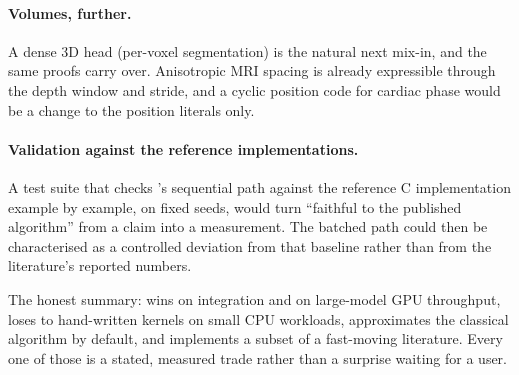 \paragraph{Volumes, further.}
A dense 3D head (per-voxel segmentation) is the natural next mix-in, and the same proofs carry
over. Anisotropic MRI spacing is already expressible through the depth window and stride, and
a cyclic position code for cardiac phase would be a change to the position literals only.

\paragraph{Validation against the reference implementations.}
A test suite that checks \ttlibname's sequential path against the reference C implementation
example by example, on fixed seeds, would turn ``faithful to the published algorithm'' from a
claim into a measurement. The batched path could then be characterised as a controlled
deviation from that baseline rather than from the literature's reported numbers.

\begin{ttkey}
The honest summary: \ttlibname wins on integration and on large-model GPU throughput, loses to
hand-written kernels on small CPU workloads, approximates the classical algorithm by default,
and implements a subset of a fast-moving literature. Every one of those is a stated, measured
trade rather than a surprise waiting for a user.
\end{ttkey}
